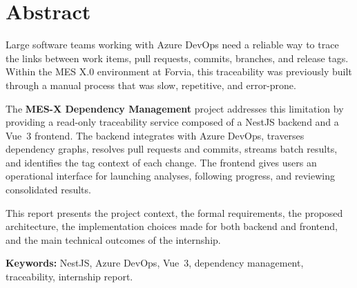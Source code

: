 \chapter*{Abstract}

Large software teams working with Azure DevOps need a reliable way to trace the
links between work items, pull requests, commits, branches, and release tags.
Within the MES X.0 environment at Forvia, this traceability was previously built
through a manual process that was slow, repetitive, and error-prone.

The \textbf{MES-X Dependency Management} project addresses this limitation by
providing a read-only traceability service composed of a NestJS backend and a
Vue~3 frontend. The backend integrates with Azure DevOps, traverses dependency
graphs, resolves pull requests and commits, streams batch results, and
identifies the tag context of each change. The frontend gives users an
operational interface for launching analyses, following progress, and reviewing
consolidated results.

This report presents the project context, the formal requirements, the proposed
architecture, the implementation choices made for both backend and frontend,
and the main technical outcomes of the internship.

\bigskip
\textbf{Keywords:} NestJS, Azure DevOps, Vue~3, dependency management, traceability,
internship report.
